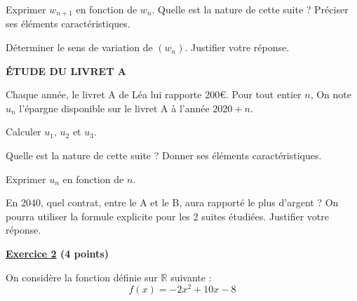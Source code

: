 \documentclass[12pt,a4paper]{exam}
\begin{document}
\vspace{5pt}
\begin{questions}

\question
{}

\question[1] Exprimer $w_{n+1}$ en fonction de $w_n$. Quelle est la nature de cette suite ? Préciser 
ses éléments caractéristiques.

\question[1] Déterminer le sens de variation de $(w_n)$. Justifier votre réponse.

\end{questions}

\vspace{0.5cm}

\textbf{ÉTUDE DU LIVRET A}

\vspace{5pt}
Chaque année, le livret A de Léa lui rapporte 200€. Pour tout entier $n$, On note $u_n$ l'épargne disponible 
sur le livret A à l'année $2020 + n$.

\vspace{5pt}
\begin{questions}

\question[0,5] Calculer $u_1$, $u_2$ et $u_3$.

\question[1] Quelle est la nature de cette suite ? Donner ses éléments caractéristiques.

\question[1] Exprimer $u_n$ en fonction de $n$.

\question[0,5] En 2040, quel contrat, entre le A et le B, aura rapporté le plus d'argent ? 
On pourra utiliser la formule explicite pour les 2 suites étudiées. Justifier votre réponse.

\end{questions}

\vspace{0.5cm}

\noindent
\textbf{\underline{Exercice 2} (4 points)}

\vspace{5pt}
\noindent
On considère la fonction définie sur $\mathbb{R}$ suivante :
\[
f(x) = -2x^2 + 10x - 8
\]
\end{document}
